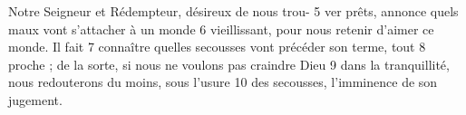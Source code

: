 Notre Seigneur et Rédempteur, désireux de nous trou-	 
5	 	ver prêts, annonce quels maux vont s'attacher à un monde	 
6	 	vieillissant, pour nous retenir d'aimer ce monde. Il fait	 
7	 	connaître quelles secousses vont précéder son terme, tout	 
8	 	proche ; de la sorte, si nous ne voulons pas craindre Dieu	 
9	 	dans la tranquillité, nous redouterons du moins, sous l'usure	 
10	 	des secousses, l'imminence de son jugement.